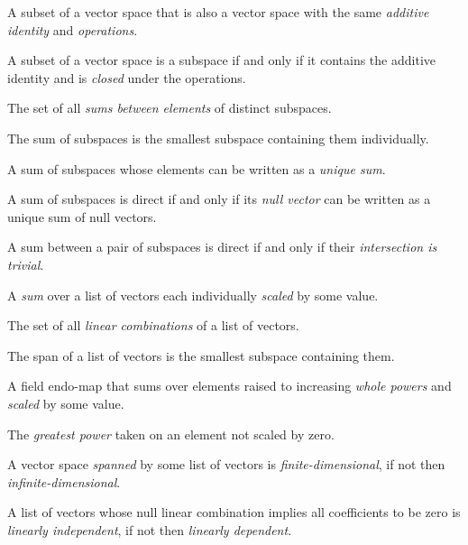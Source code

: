 \begin{multicols}{3}
  A subset of a vector space that is also a vector space with the same \textit{additive identity} and \textit{operations}.

  A subset of a vector space is a subspace if and only if it contains the additive identity and is \textit{closed} under the operations.

  The set of all \textit{sums between elements} of distinct subspaces.
  
  The sum of subspaces is the smallest subspace containing them individually.
  
  A sum of subspaces whose elements can be written as a \textit{unique sum}.
  
  A sum of subspaces is direct if and only if its \textit{null vector} can be written as a unique sum of null vectors.

  A sum between a pair of subspaces is direct if and only if their \textit{intersection is trivial}.

  A \textit{sum} over a list of vectors each individually \textit{scaled} by some value.
  
  The set of all \textit{linear combinations} of a list of vectors.
  
  The span of a list of vectors is the smallest subspace containing them.

  A field endo-map that sums over elements raised to increasing \textit{whole powers} and \textit{scaled} by some value.
  
  The \textit{greatest power} taken on an element not scaled by zero.
  
  A vector space \textit{spanned} by some list of vectors is \textit{finite-dimensional}, if not then \textit{infinite-dimensional}.
  
  A list of vectors whose null linear combination implies all coefficients to be zero is \textit{linearly independent},
  if not then \textit{linearly dependent}.


\end{multicols}
